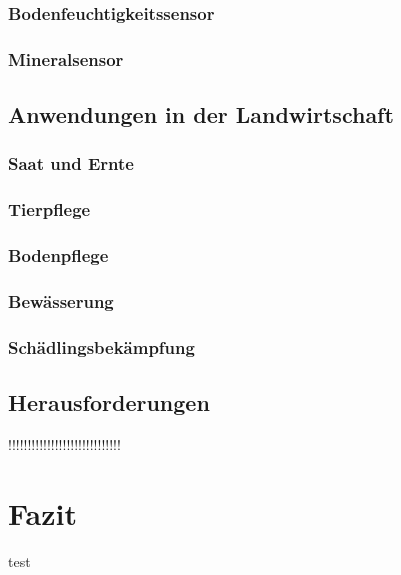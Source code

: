 \documentclass[a4paper,
			   11pt,
			   ngerman, 
			   headsepline]{scrreprt}
\begin{document}
		\subsection{Bodenfeuchtigkeitssensor}
		
		\subsection{Mineralsensor}
		
	
	\section{Anwendungen in der Landwirtschaft}
		
		\subsection{Saat und Ernte}
		
		
		\subsection{Tierpflege}
		
		
		\subsection{Bodenpflege}
		
		
		\subsection{Bewässerung}
		
		
		\subsection{Schädlingsbekämpfung}
		
	\section{Herausforderungen}
	!!!!!!!!!!!!!!!!!!!!!!!!!!!!!
	\chapter{Fazit}
	
	
	\printbibliography
	
	\listoffigures
	test
\end{document}
